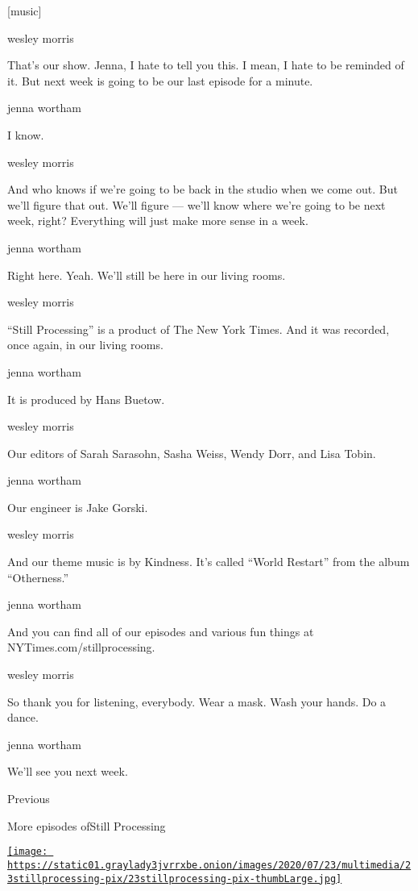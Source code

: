 {[}music{]}

wesley morris

That's our show. Jenna, I hate to tell you this. I mean, I hate to be
reminded of it. But next week is going to be our last episode for a
minute.

jenna wortham

I know.

wesley morris

And who knows if we're going to be back in the studio when we come out.
But we'll figure that out. We'll figure --- we'll know where we're going
to be next week, right? Everything will just make more sense in a week.

jenna wortham

Right here. Yeah. We'll still be here in our living rooms.

wesley morris

``Still Processing'' is a product of The New York Times. And it was
recorded, once again, in our living rooms.

jenna wortham

It is produced by Hans Buetow.

wesley morris

Our editors of Sarah Sarasohn, Sasha Weiss, Wendy Dorr, and Lisa Tobin.

jenna wortham

Our engineer is Jake Gorski.

wesley morris

And our theme music is by Kindness. It's called ``World Restart'' from
the album ``Otherness.''

jenna wortham

And you can find all of our episodes and various fun things at
NYTimes.com/stillprocessing.

wesley morris

So thank you for listening, everybody. Wear a mask. Wash your hands. Do
a dance.

jenna wortham

We'll see you next week.

Previous

More episodes ofStill Processing

\href{https://www.nytimes3xbfgragh.onion/2020/07/23/podcasts/hamilton-ziwe-discomfort.html?action=click\&module=audio-series-bar\&region=header\&pgtype=Article}{\texttt{[image: https://static01.graylady3jvrrxbe.onion/images/2020/07/23/multimedia/23stillprocessing-pix/23stillprocessing-pix-thumbLarge.jpg]}}

